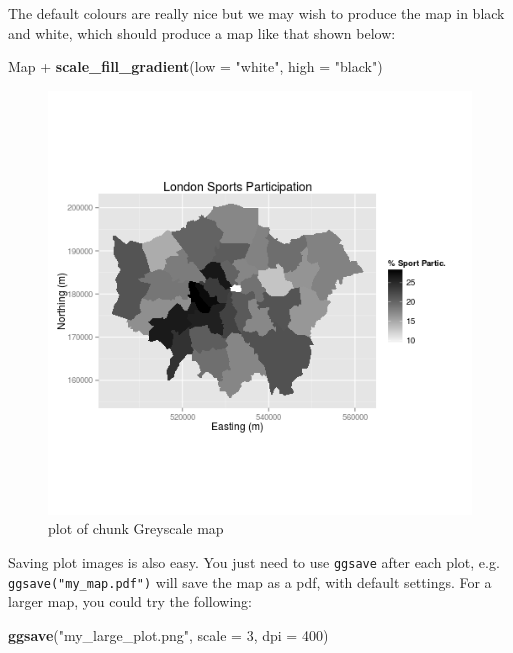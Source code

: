 \documentclass[]{article}
\makeatletter
\newenvironment{Shaded}{}{}
\newcommand{\KeywordTok}[1]{\textcolor[rgb]{0.00,0.44,0.13}{\textbf{{#1}}}}
\newcommand{\DataTypeTok}[1]{\textcolor[rgb]{0.56,0.13,0.00}{{#1}}}
\newcommand{\DecValTok}[1]{\textcolor[rgb]{0.25,0.63,0.44}{{#1}}}
\newcommand{\StringTok}[1]{\textcolor[rgb]{0.25,0.44,0.63}{{#1}}}
\newcommand{\NormalTok}[1]{{#1}}
\def\maxwidth{\ifdim\Gin@nat@width>\linewidth\linewidth
\else\Gin@nat@width\fi}
\let\Oldincludegraphics\includegraphics
\renewcommand{\includegraphics}[1]{\Oldincludegraphics[width=\maxwidth]{#1}}
\makeatother
\begin{document}
The default colours are really nice but we may wish to produce the map
in black and white, which should produce a map like that shown below:

\begin{Shaded}
\begin{Highlighting}[]
\NormalTok{Map + }\KeywordTok{scale_fill_gradient}\NormalTok{(}\DataTypeTok{low =} \StringTok{"white"}\NormalTok{, }\DataTypeTok{high =} \StringTok{"black"}\NormalTok{)}
\end{Highlighting}
\end{Shaded}
\begin{figure}[htbp]
\centering
\includegraphics{figure/Greyscale_map.png}
\caption{plot of chunk Greyscale map}
\end{figure}

Saving plot images is also easy. You just need to use \texttt{ggsave}
after each plot, e.g. \texttt{ggsave("my\_map.pdf")} will save the map
as a pdf, with default settings. For a larger map, you could try the
following:

\begin{Shaded}
\begin{Highlighting}[]
\KeywordTok{ggsave}\NormalTok{(}\StringTok{"my_large_plot.png"}\NormalTok{, }\DataTypeTok{scale =} \DecValTok{3}\NormalTok{, }\DataTypeTok{dpi =} \DecValTok{400}\NormalTok{)}
\end{Highlighting}
\end{Shaded}
\end{document}
